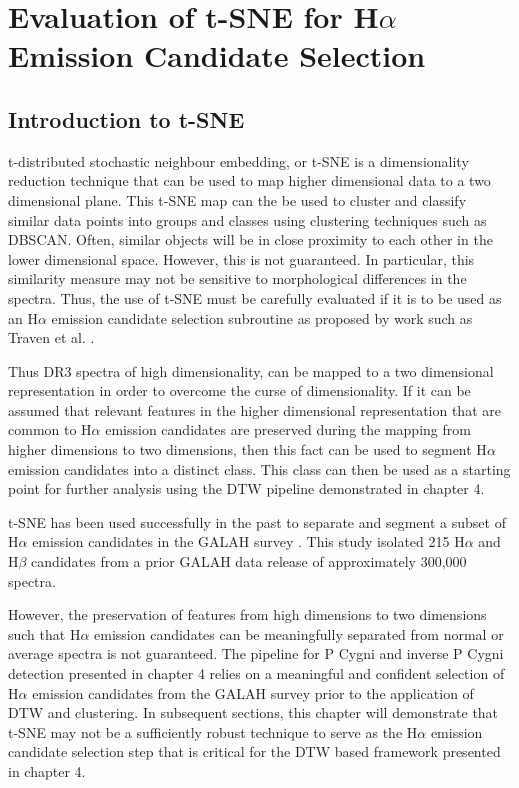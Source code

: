 \chapter{Evaluation of t-SNE for H$\alpha$ Emission Candidate Selection}

\section{Introduction to t-SNE}

t-distributed stochastic neighbour embedding, or t-SNE is a dimensionality reduction technique \cite{van2008visualizing} that can be used to map higher dimensional data to a two dimensional plane. This t-SNE map can the be used to cluster and classify similar data points into groups and classes using clustering techniques such as DBSCAN. Often, similar objects will be in close proximity to each other in the lower dimensional space. However, this is not guaranteed. In particular, this similarity measure may not be sensitive to morphological differences in the spectra. Thus, the use of t-SNE must be carefully evaluated if it is to be used as an H$\alpha$ emission candidate selection subroutine as proposed by work such as Traven et al. \cite{traven2017galah}.

Thus DR3 spectra of high dimensionality, can be mapped to a two dimensional representation in order to overcome the curse of dimensionality. If it can be assumed that relevant features in the higher dimensional representation that are common to H$\alpha$ emission candidates are preserved during the mapping from higher dimensions to two dimensions, then this fact can be used to segment H$\alpha$ emission candidates into a distinct class. This class can then be used as a starting point for further analysis using the DTW pipeline demonstrated in chapter 4. 

t-SNE has been used successfully in the past to separate and segment a subset of H$\alpha$ emission candidates in the GALAH survey \cite{traven2017galah}. This study isolated 215 H$\alpha$ and H$\beta$ candidates from a prior GALAH data release of approximately 300,000 spectra. 

However, the preservation of features from high dimensions to two dimensions such that H$\alpha$ emission candidates can be meaningfully separated from normal or average spectra is not guaranteed. The pipeline for P Cygni and inverse P Cygni detection presented in chapter 4 relies on a meaningful and confident selection of H$\alpha$ emission candidates from the GALAH survey prior to the application of DTW and clustering. In subsequent sections, this chapter will demonstrate that t-SNE may not be a sufficiently robust technique to serve as the H$\alpha$ emission candidate selection step that is critical for the DTW based framework presented in chapter 4.

